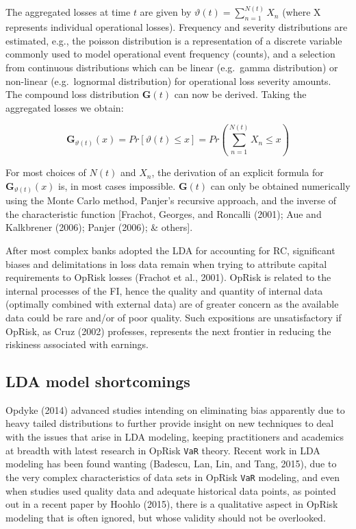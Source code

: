 \documentclass[]{DissertateUSU}
\begin{document}
The aggregated losses at time \(t\) are given by
\(\vartheta(t) = \sum_{n=1}^{N(t)} X_{n}\) (where X represents
individual operational losses). Frequency and severity distributions are
estimated, e.g., the poisson distribution is a representation of a
discrete variable commonly used to model operational event frequency
(counts), and a selection from continuous distributions which can be
linear (e.g.~gamma distribution) or non-linear (e.g.~lognormal
distribution) for operational loss severity amounts. The compound loss
distribution \(\mathbf{G}(t)\) can now be derived. Taking the aggregated
losses we obtain:

\singlespacing

\begin{equation}\label{Compound_losses}
\mathbf{G}_{\vartheta(t)}(x)=Pr[\vartheta(t)\leq x]=Pr\left(\sum_{n=1}^{N(t)}X_{n} \leq x\right)
\end{equation}

\doublespacing

For most choices of \(N(t)\) and \(X_{n}\), the derivation of an
explicit formula for \(\mathbf{G}_{\vartheta(t)}(x)\) is, in most cases
impossible. \(\mathbf{G}(t)\) can only be obtained numerically using the
Monte Carlo method, Panjer's recursive approach, and the inverse of the
characteristic function {[}Frachot, Georges, and Roncalli (2001); Aue
and Kalkbrener (2006); Panjer (2006); \& others{]}. \medskip

After most complex banks adopted the LDA for accounting for RC,
significant biases and delimitations in loss data remain when trying to
attribute capital requirements to OpRisk losses (Frachot et al., 2001).
OpRisk is related to the internal processes of the FI, hence the quality
and quantity of internal data (optimally combined with external data)
are of greater concern as the available data could be rare and/or of
poor quality. Such expositions are unsatisfactory if OpRisk, as Cruz
(2002) professes, represents the next frontier in reducing the riskiness
associated with earnings.

\subsection{LDA model shortcomings}
\label{ssec:LDA model shortcomings}

Opdyke (2014) advanced studies intending on eliminating bias apparently
due to heavy tailed distributions to further provide insight on new
techniques to deal with the issues that arise in LDA modeling, keeping
practitioners and academics at breadth with latest research in OpRisk
\texttt{VaR} theory. Recent work in LDA modeling has been found wanting
(Badescu, Lan, Lin, and Tang, 2015), due to the very complex
characteristics of data sets in OpRisk \texttt{VaR} modeling, and even
when studies used quality data and adequate historical data points, as
pointed out in a recent paper by Hoohlo (2015), there is a qualitative
aspect in OpRisk modeling that is often ignored, but whose validity
should not be overlooked. \medskip
\end{document}
